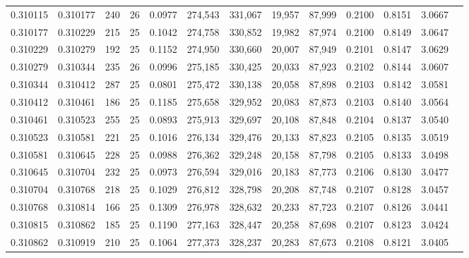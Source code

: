 \begin{tabular}{rrrrrrrrrrrrr}
0.310115 & 0.310177 &   240 &  26 &                                     0.0977 & 274,543 & 331,067 &  19,957 &  87,999 & 0.2100 & 0.8151 & 3.0667 \\
0.310177 & 0.310229 &   215 &  25 &                                     0.1042 & 274,758 & 330,852 &  19,982 &  87,974 & 0.2100 & 0.8149 & 3.0647 \\
0.310229 & 0.310279 &   192 &  25 &                                     0.1152 & 274,950 & 330,660 &  20,007 &  87,949 & 0.2101 & 0.8147 & 3.0629 \\
0.310279 & 0.310344 &   235 &  26 &                                     0.0996 & 275,185 & 330,425 &  20,033 &  87,923 & 0.2102 & 0.8144 & 3.0607 \\
0.310344 & 0.310412 &   287 &  25 &                                     0.0801 & 275,472 & 330,138 &  20,058 &  87,898 & 0.2103 & 0.8142 & 3.0581 \\
0.310412 & 0.310461 &   186 &  25 &                                     0.1185 & 275,658 & 329,952 &  20,083 &  87,873 & 0.2103 & 0.8140 & 3.0564 \\
0.310461 & 0.310523 &   255 &  25 &                                     0.0893 & 275,913 & 329,697 &  20,108 &  87,848 & 0.2104 & 0.8137 & 3.0540 \\
0.310523 & 0.310581 &   221 &  25 &                                     0.1016 & 276,134 & 329,476 &  20,133 &  87,823 & 0.2105 & 0.8135 & 3.0519 \\
0.310581 & 0.310645 &   228 &  25 &                                     0.0988 & 276,362 & 329,248 &  20,158 &  87,798 & 0.2105 & 0.8133 & 3.0498 \\
0.310645 & 0.310704 &   232 &  25 &                                     0.0973 & 276,594 & 329,016 &  20,183 &  87,773 & 0.2106 & 0.8130 & 3.0477 \\
0.310704 & 0.310768 &   218 &  25 &                                     0.1029 & 276,812 & 328,798 &  20,208 &  87,748 & 0.2107 & 0.8128 & 3.0457 \\
0.310768 & 0.310814 &   166 &  25 &                                     0.1309 & 276,978 & 328,632 &  20,233 &  87,723 & 0.2107 & 0.8126 & 3.0441 \\
0.310815 & 0.310862 &   185 &  25 &                                     0.1190 & 277,163 & 328,447 &  20,258 &  87,698 & 0.2107 & 0.8123 & 3.0424 \\
0.310862 & 0.310919 &   210 &  25 &                                     0.1064 & 277,373 & 328,237 &  20,283 &  87,673 & 0.2108 & 0.8121 & 3.0405 \\

\end{tabular}
